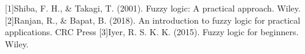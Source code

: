[1]Shiba, F. H., \& Takagi, T. (2001). Fuzzy logic: A practical approach. Wiley.
[2]Ranjan, R., \& Bapat, B. (2018). An introduction to fuzzy logic for practical applications. CRC Press
[3]Iyer, R. S. K. K. (2015). Fuzzy logic for beginners. Wiley.
